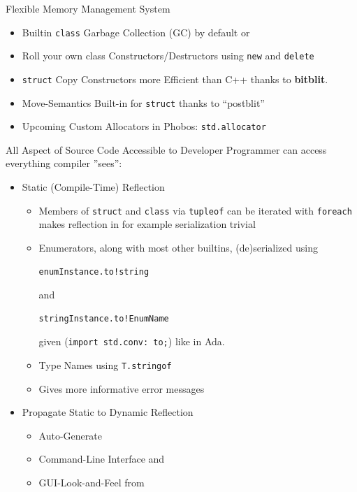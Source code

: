 \documentclass[xcolor=dvipsnames]{beamer}
\begin{document}
\begin{frame}[fragile]{Flexible Memory Management System}
  \begin{itemize}[<+->]
  \item Builtin \texttt{class} Garbage Collection (GC) by default  or
  \item Roll your own class Constructors/Destructors using \texttt{new} and
    \texttt{delete}
  \item \texttt{struct} Copy Constructors more Efficient than C++ thanks to
    \textbf{bitblit}.
  \item Move-Semantics Built-in for \texttt{struct} thanks to “postblit”
  \item Upcoming Custom Allocators in Phobos:  \texttt{std.allocator}
  \end{itemize}
\end{frame}

\begin{frame}[fragile]{All Aspect of Source Code Accessible to Developer}
  Programmer can access everything compiler ”sees”:
  \begin{itemize}[<+->]
  \item Static (Compile-Time) Reflection
    \begin{itemize}[<+->]
    \item Members of \texttt{struct} and \texttt{class} via \texttt{tupleof} can
      be iterated with \texttt{foreach} makes reflection in for example
      serialization trivial
    \item Enumerators, along with most other builtins, (de)serialized using
\begin{lstlisting}[frame=single]
enumInstance.to!string
\end{lstlisting}
and
\begin{lstlisting}[frame=single]
stringInstance.to!EnumName
\end{lstlisting}
given (\texttt{import std.conv: to;}) like in Ada.
    \item Type Names using \texttt{T.stringof}
    \item Gives more informative error messages
    \end{itemize}
  \item Propagate Static to Dynamic Reflection
    \begin{itemize}[<+->]
    \item Auto-Generate
    \item Command-Line Interface and
    \item GUI-Look-and-Feel from
    \end{itemize}
  \end{itemize}
\end{frame}
\end{document}
